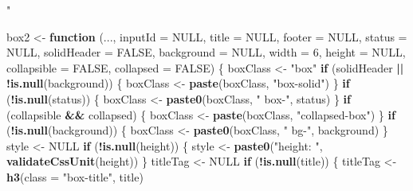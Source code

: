 \documentclass[
]{book}
\newenvironment{Shaded}{\begin{snugshade}}{\end{snugshade}}
\newcommand{\ControlFlowTok}[1]{\textcolor[rgb]{0.13,0.29,0.53}{\textbf{#1}}}
\newcommand{\DataTypeTok}[1]{\textcolor[rgb]{0.13,0.29,0.53}{#1}}
\newcommand{\DecValTok}[1]{\textcolor[rgb]{0.00,0.00,0.81}{#1}}
\newcommand{\KeywordTok}[1]{\textcolor[rgb]{0.13,0.29,0.53}{\textbf{#1}}}
\newcommand{\NormalTok}[1]{#1}
\newcommand{\OperatorTok}[1]{\textcolor[rgb]{0.81,0.36,0.00}{\textbf{#1}}}
\newcommand{\OtherTok}[1]{\textcolor[rgb]{0.56,0.35,0.01}{#1}}
\newcommand{\StringTok}[1]{\textcolor[rgb]{0.31,0.60,0.02}{#1}}
\begin{document}
\begin{Shaded}
\begin{Highlighting}[]
\StringTok{"%

\NormalTok{box2 <-}\StringTok{ }\ControlFlowTok{function}\NormalTok{ (..., }\DataTypeTok{inputId =} \OtherTok{NULL}\NormalTok{, }\DataTypeTok{title =} \OtherTok{NULL}\NormalTok{, }\DataTypeTok{footer =} \OtherTok{NULL}\NormalTok{, }\DataTypeTok{status =} \OtherTok{NULL}\NormalTok{, }\DataTypeTok{solidHeader =} \OtherTok{FALSE}\NormalTok{, }
                 \DataTypeTok{background =} \OtherTok{NULL}\NormalTok{, }\DataTypeTok{width =} \DecValTok{6}\NormalTok{, }\DataTypeTok{height =} \OtherTok{NULL}\NormalTok{, }\DataTypeTok{collapsible =} \OtherTok{FALSE}\NormalTok{, }
                 \DataTypeTok{collapsed =} \OtherTok{FALSE}\NormalTok{) }
\NormalTok{\{}
\NormalTok{  boxClass <-}\StringTok{ "box"}
  \ControlFlowTok{if}\NormalTok{ (solidHeader }\OperatorTok{||}\StringTok{ }\OperatorTok{!}\KeywordTok{is.null}\NormalTok{(background)) \{}
\NormalTok{    boxClass <-}\StringTok{ }\KeywordTok{paste}\NormalTok{(boxClass, }\StringTok{"box-solid"}\NormalTok{)}
\NormalTok{  \}}
  \ControlFlowTok{if}\NormalTok{ (}\OperatorTok{!}\KeywordTok{is.null}\NormalTok{(status)) \{}
\NormalTok{    boxClass <-}\StringTok{ }\KeywordTok{paste0}\NormalTok{(boxClass, }\StringTok{" box-"}\NormalTok{, status)}
\NormalTok{  \}}
  \ControlFlowTok{if}\NormalTok{ (collapsible }\OperatorTok{&&}\StringTok{ }\NormalTok{collapsed) \{}
\NormalTok{    boxClass <-}\StringTok{ }\KeywordTok{paste}\NormalTok{(boxClass, }\StringTok{"collapsed-box"}\NormalTok{)}
\NormalTok{  \}}
  \ControlFlowTok{if}\NormalTok{ (}\OperatorTok{!}\KeywordTok{is.null}\NormalTok{(background)) \{}
\NormalTok{    boxClass <-}\StringTok{ }\KeywordTok{paste0}\NormalTok{(boxClass, }\StringTok{" bg-"}\NormalTok{, background)}
\NormalTok{  \}}
\NormalTok{  style <-}\StringTok{ }\OtherTok{NULL}
  \ControlFlowTok{if}\NormalTok{ (}\OperatorTok{!}\KeywordTok{is.null}\NormalTok{(height)) \{}
\NormalTok{    style <-}\StringTok{ }\KeywordTok{paste0}\NormalTok{(}\StringTok{"height: "}\NormalTok{, }\KeywordTok{validateCssUnit}\NormalTok{(height))}
\NormalTok{  \}}
\NormalTok{  titleTag <-}\StringTok{ }\OtherTok{NULL}
  \ControlFlowTok{if}\NormalTok{ (}\OperatorTok{!}\KeywordTok{is.null}\NormalTok{(title)) \{}
\NormalTok{    titleTag <-}\StringTok{ }\KeywordTok{h3}\NormalTok{(}\DataTypeTok{class =} \StringTok{"box-title"}\NormalTok{, title)}
}
\end{Highlighting}
\end{Shaded}
\end{document}
